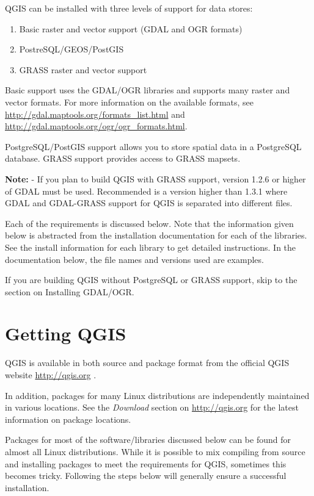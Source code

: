 QGIS can be installed with three levels of support for data stores:
\begin{enumerate}
\item Basic raster and vector support (GDAL and OGR formats)
\item PostreSQL/GEOS/PostGIS 
\item GRASS raster and vector support
\end{enumerate} 

Basic support uses the GDAL/OGR libraries and supports many raster and
vector formats. For more information on the available formats, see
\url{http://gdal.maptools.org/formats_list.html} and
\url{http://gdal.maptools.org/ogr/ogr_formats.html}.

PostgreSQL/PostGIS support allows you to store spatial data in a PostgreSQL
database. GRASS support provides access to GRASS mapsets. 

\textbf{Note:} - If you plan to build QGIS with GRASS support, version
1.2.6 or higher of GDAL must be used. Recommended is a version higher than 
1.3.1 where GDAL and GDAL-GRASS support for QGIS is separated into different 
files.
  
Each of the requirements is discussed below. Note that the information
given below is abstracted from the installation documentation for each of
the libraries. See the install information for each library to get detailed
instructions. In the documentation below, the file names and versions used
are examples.

If you are building QGIS without PostgreSQL or GRASS support, skip to the
section on Installing GDAL/OGR. 

\section{Getting QGIS}

QGIS is available in both source and package format from
the official QGIS website \url{http://qgis.org} \cite{QGISweb}. 

In addition, packages for many Linux distributions are independently
maintained in various locations. See the \textit{Download} section on
\url{http://qgis.org} for the latest information on package locations.

Packages for most of the software/libraries discussed below can be found
for almost all Linux distributions. While it is possible to mix compiling
from source and installing packages to meet the requirements for QGIS,
sometimes this becomes tricky. Following the steps below will generally
ensure a successful installation. 


